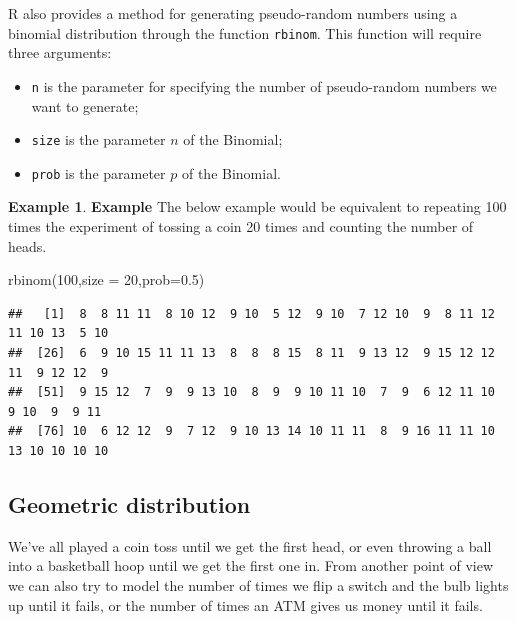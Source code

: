 \documentclass[
]{book}
\newenvironment{Shaded}{\begin{snugshade}}{\end{snugshade}}
\newcommand{\AttributeTok}[1]{\textcolor[rgb]{0.77,0.63,0.00}{#1}}
\newcommand{\DecValTok}[1]{\textcolor[rgb]{0.00,0.00,0.81}{#1}}
\newcommand{\FloatTok}[1]{\textcolor[rgb]{0.00,0.00,0.81}{#1}}
\newcommand{\FunctionTok}[1]{\textcolor[rgb]{0.00,0.00,0.00}{#1}}
\newcommand{\NormalTok}[1]{#1}
\providecommand{\tightlist}{%
  \setlength{\itemsep}{0pt}\setlength{\parskip}{0pt}}
\theoremstyle{definition}
\theoremstyle{definition}
\newtheorem{example}{Example}[chapter]
\theoremstyle{definition}
\theoremstyle{definition}
\theoremstyle{remark}
\begin{document}
R also provides a method for generating pseudo-random numbers using a binomial distribution through the function \texttt{rbinom}. This function will require three arguments:

\begin{itemize}
\tightlist
\item
  \texttt{n} is the parameter for specifying the number of pseudo-random numbers we want to generate;
\item
  \texttt{size} is the parameter \(n\) of the Binomial;
\item
  \texttt{prob} is the parameter \(p\) of the Binomial.
\end{itemize}

\begin{example}
\textbf{Example}
The below example would be equivalent to repeating 100 times the experiment of tossing a coin 20 times and counting the number of heads.
\end{example}

\begin{Shaded}
\begin{Highlighting}[]
\FunctionTok{rbinom}\NormalTok{(}\DecValTok{100}\NormalTok{,}\AttributeTok{size =} \DecValTok{20}\NormalTok{,}\AttributeTok{prob=}\FloatTok{0.5}\NormalTok{)}
\end{Highlighting}
\end{Shaded}

\begin{verbatim}
##   [1]  8  8 11 11  8 10 12  9 10  5 12  9 10  7 12 10  9  8 11 12 11 10 13  5 10
##  [26]  6  9 10 15 11 11 13  8  8  8 15  8 11  9 13 12  9 15 12 12 11  9 12 12  9
##  [51]  9 15 12  7  9  9 13 10  8  9  9 10 11 10  7  9  6 12 11 10  9 10  9  9 11
##  [76] 10  6 12 12  9  7 12  9 10 13 14 10 11 11  8  9 16 11 11 10 13 10 10 10 10
\end{verbatim}

\hypertarget{geometric-distribution}{%
\subsection{Geometric distribution}\label{geometric-distribution}}

We've all played a coin toss until we get the first head, or even throwing a ball into a basketball hoop until we get the first one in. From another point of view we can also try to model the number of times we flip a switch and the bulb lights up until it fails, or the number of times an ATM gives us money until it fails.
\end{document}
